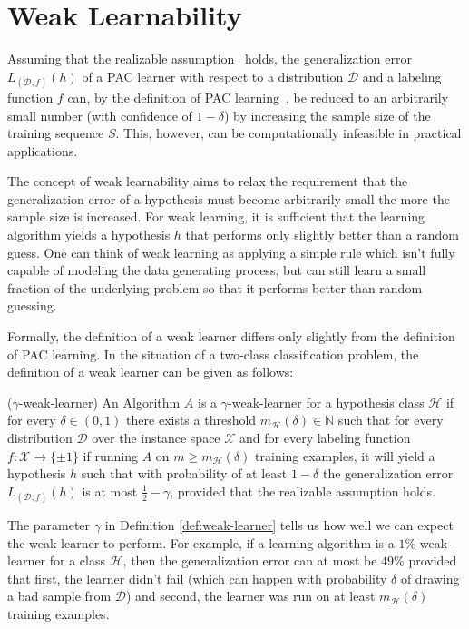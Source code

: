 \section{Weak Learnability}

Assuming that the realizable assumption~\cite[chapter 2]{SSBD14} holds, the generalization error
$L_{(\mathcal{D}, f)}(h)$ of a PAC learner with respect to a distribution $\mathcal{D}$ and a
labeling function $f$ can, by the definition of PAC learning~\mbox{\cite[chapter 2]{SSBD14}},
be reduced to an arbitrarily
small number (with confidence of $1-\delta$) by increasing the sample size of the training sequence $S$.
This, however, can be computationally infeasible in practical applications.

The concept of weak learnability aims to relax the requirement that the generalization error of a hypothesis must
become arbitrarily small the more the sample size is increased.
For weak learning, it is sufficient that the learning algorithm yields a hypothesis $h$ that performs only slightly
better than a random guess.
One can think of weak learning as applying a simple rule which isn't fully capable of modeling the data generating process,
but can still learn a small fraction of the underlying problem so that it performs better than random guessing.

Formally, the definition of a weak learner differs only slightly from the definition of PAC learning.
In the situation of a two-class classification problem, the definition of a weak learner can be given as follows:

\begin{definition}{($\gamma$-weak-learner)}
\label{def:weak-learner}
An Algorithm $A$ is a $\gamma$-weak-learner for a hypothesis class $\mathcal{H}$ if for every $\delta \in (0, 1)$ there
exists a threshold $m_\mathcal{H}(\delta) \in \mathbb{N}$
such that for every distribution $\mathcal{D}$ over the instance space $\mathcal{X}$
and for every labeling function $f: \mathcal{X} \rightarrow \{\pm 1\}$
if running $A$ on $m \geq m_\mathcal{H}(\delta)$ training
examples, it will yield a hypothesis $h$ such that with probability of at least $1-\delta$ the generalization error
$L_{(\mathcal{D}, f)}(h)$ is at most $\frac{1}{2} - \gamma$, provided that the realizable assumption holds.
\end{definition}

The parameter $\gamma$ in Definition \ref{def:weak-learner} tells us how well we can expect the weak learner to perform.
For example, if a learning algorithm is a $1\%$-weak-learner for a class $\mathcal{H}$, then the generalization
error can at most be $49\%$ provided that first, the learner didn't fail
(which can happen with probability $\delta$ of drawing a bad sample from $\mathcal{D}$)
and second, the learner was run on at least $m_\mathcal{H}(\delta)$ training examples.


